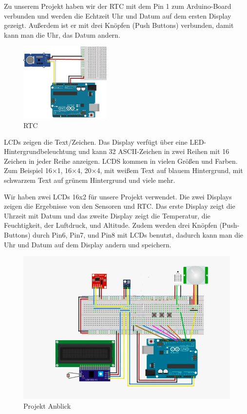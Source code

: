 \documentclass[conference]{IEEEtran}
\begin{document}
Zu unserem Projekt haben wir der RTC mit dem Pin 1 zum Arduino-Board verbunden und werden die Echtzeit Uhr und Datum auf dem ersten Display gezeigt. Außerdem ist er mit drei Knöpfen (Push Buttons) verbunden, damit kann man die Uhr, das Datum andern. 

\begin{figure}[h]
	\centering
	\includegraphics[width=0.7\linewidth]{fig30}
	\caption{RTC}
	\label{fig:fig30}
\end{figure}

LCDs zeigen die Text/Zeichen. Das Display verfügt über eine LED-Hintergrundbeleuchtung und kann 32 ASCII-Zeichen in zwei Reihen mit 16 Zeichen in jeder Reihe anzeigen.
LCDS kommen in vielen Größen und Farben. Zum Beispiel 16×1, 16×4, 20×4, mit weißem Text auf blauem Hintergrund, mit schwarzem Text auf grünem Hintergrund und viele mehr.

Wir haben zwei LCDs 16x2 für unsere Projekt verwendet. Die zwei Displays zeigen die Ergebnisse von den Sensoren und RTC.  Das erste Display zeigt die Uhrzeit mit Datum und das zweite Display zeigt die Temperatur, die Feuchtigkeit, der Luftdruck, und Altitude. 
Zudem werden drei Knöpfen (Push-Buttons) durch Pin6, Pin7, und Pin8 mit LCDs benutzt, dadurch kann man die Uhr und Datum auf dem Display andern und speichern.  
\begin{figure}[h]
	\centering
	\includegraphics[width=1\linewidth]{fig37}
	\caption{Projekt Anblick}
	\label{fig:fig37}
\end{figure}
\end{document}
